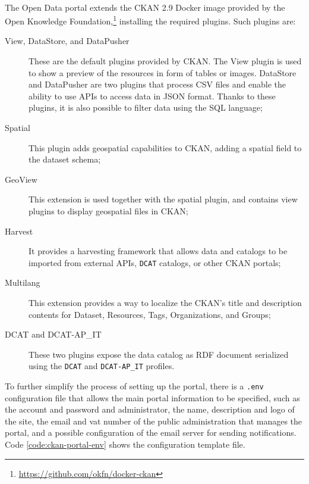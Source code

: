\paragraph*{}
The Open Data portal extends the CKAN 2.9 Docker image provided by the Open Knowledge Foundation,\footnote{\url{https://github.com/okfn/docker-ckan}} installing the required plugins. Such plugins are:

\begin{description}
  \item[View, DataStore, and DataPusher] These are the default plugins provided by CKAN. The View plugin is used to show a preview of the resources in form of tables or images. DataStore and DataPusher are two plugins that process \ac{CSV} files and enable the ability to use \acsp{API} to access data in \ac{JSON} format. Thanks to these plugins, it is also possible to filter data using the \acs{SQL} language;
  \item[Spatial] This plugin adds geospatial capabilities to CKAN, adding a spatial field to the dataset schema;
  \item[GeoView] This extension is used together with the spatial plugin, and contains view plugins to display geospatial files in CKAN;
  \item[Harvest] It provides a harvesting framework that allows data and catalogs to be imported from external \acsp{API}, \verb#DCAT# catalogs, or other CKAN portals;
  \item[Multilang] This extension provides a way to localize the CKAN's title and description contents for Dataset, Resources, Tags, Organizations, and Groups;
  \item[DCAT and DCAT-AP\_IT] These two plugins expose the data catalog as \ac{RDF} document serialized using the \verb#DCAT# and \verb#DCAT-AP_IT# profiles.
\end{description}

To further simplify the process of setting up the portal, there is a \verb#.env# configuration file that allows the main portal information to be specified, such as the account and password and administrator, the name, description and logo of the site, the email and vat number of the public administration that manages the portal, and a possible configuration of the email server for sending notifications. Code \ref{code:ckan-portal-env} shows the configuration template file.


